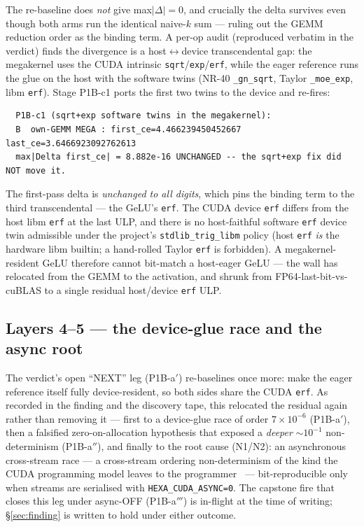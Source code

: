 \documentclass[11pt,a4paper]{article}
\begin{document}
\noindent The re-baseline does \emph{not} give max$|\Delta|=0$, and crucially
the delta survives even though both arms run the identical naive-$k$ sum ---
ruling out the GEMM reduction order as the binding term. A per-op audit
(reproduced verbatim in the verdict) finds the divergence is a
host$\leftrightarrow$device transcendental gap: the megakernel uses the CUDA
intrinsic \texttt{sqrt}/\texttt{exp}/\texttt{erf}, while the eager reference
runs the glue on the host with the software twins (NR-40
\texttt{\_gn\_sqrt}, Taylor \texttt{\_moe\_exp}, libm \texttt{erf}). Stage
P1B-c1 ports the first two twins to the device and re-fires:

\begin{lstlisting}
  P1B-c1 (sqrt+exp software twins in the megakernel):
  B  own-GEMM MEGA : first_ce=4.466239450452667  last_ce=3.6466923092762613
  max|Delta first_ce| = 8.882e-16 UNCHANGED -- the sqrt+exp fix did NOT move it.
\end{lstlisting}

\noindent The first-pass delta is \emph{unchanged to all digits}, which pins
the binding term to the third transcendental --- the GeLU's \texttt{erf}.
The CUDA device \texttt{erf} differs from the host libm \texttt{erf} at the
last ULP, and there is no host-faithful software \texttt{erf} device twin
admissible under the project's \texttt{stdlib\_trig\_libm} policy (host
\texttt{erf} \emph{is} the hardware libm builtin; a hand-rolled Taylor
\texttt{erf} is forbidden). A megakernel-resident GeLU therefore cannot
bit-match a host-eager GeLU --- the wall has relocated from the GEMM to the
activation, and shrunk from FP64-last-bit-vs-cuBLAS to a single residual
host/device \texttt{erf} ULP.

\subsection{Layers 4--5 --- the device-glue race and the async root}
\label{sec:n1n2}

The verdict's open ``NEXT'' leg (P1B-a$'$) re-baselines once more: make the
eager reference itself fully device-resident, so both sides share the CUDA
\texttt{erf}. As recorded in the finding and the discovery tape, this
relocated the residual again rather than removing it --- first to a
device-glue race of order $7\times10^{-6}$ (P1B-a$'$), then a falsified
zero-on-allocation hypothesis that exposed a \emph{deeper} ${\sim}10^{-1}$
non-determinism (P1B-a$''$), and finally to the root cause (N1/N2): an
asynchronous cross-stream race --- a cross-stream ordering non-determinism of
the kind the CUDA programming model leaves to the
programmer~\citep{nvidia2024cuda} --- bit-reproducible only when streams are
serialised with \texttt{HEXA\_CUDA\_ASYNC=0}. The capstone fire that closes
this leg under async-OFF (P1B-a$'''$) is in-flight at the time of writing;
\S\ref{sec:finding} is written to hold under either outcome.
\end{document}
